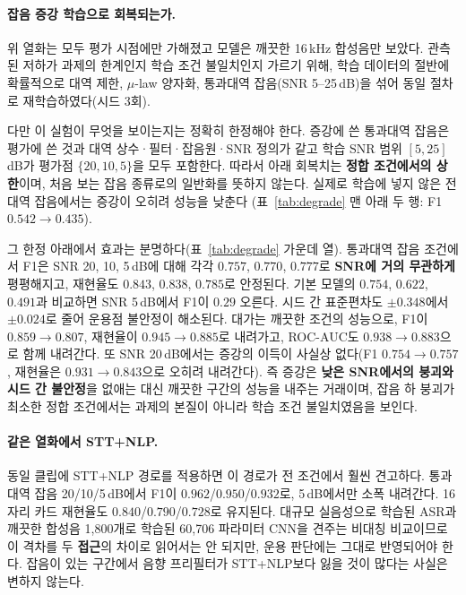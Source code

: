 \documentclass[11pt]{article}
\renewcommand{\emph}[1]{\textbf{#1}}
\begin{document}
\paragraph{잡음 증강 학습으로 회복되는가.}
위 열화는 모두 평가 시점에만 가해졌고 모델은 깨끗한 16\,kHz 합성음만 보았다. 관측된 저하가
과제의 한계인지 학습 조건 불일치인지 가르기 위해, 학습 데이터의 절반에 확률적으로 대역 제한,
$\mu$-law 양자화, 통과대역 잡음(SNR 5--25\,dB)을 섞어 동일 절차로 재학습하였다(시드 3회).

다만 이 실험이 무엇을 보이는지는 정확히 한정해야 한다. 증강에 쓴 통과대역 잡음은 평가에 쓴
것과 대역 상수·필터·잡음원·SNR 정의가 같고 학습 SNR 범위 $[5, 25]$\,dB가 평가점 $\{20, 10, 5\}$을
모두 포함한다. 따라서 아래 회복치는 \emph{정합 조건에서의 상한}이며, 처음 보는 잡음 종류로의
일반화를 뜻하지 않는다. 실제로 학습에 넣지 않은 전대역 잡음에서는 증강이 오히려 성능을 낮춘다
(표~\ref{tab:degrade} 맨 아래 두 행: F1 $0.542\to0.435$).

그 한정 아래에서 효과는 분명하다(표~\ref{tab:degrade} 가운데 열). 통과대역 잡음 조건에서
F1은 SNR 20, 10, 5\,dB에 대해 각각 $0.757$, $0.770$, $0.777$로 \emph{SNR에 거의 무관하게}
평평해지고, 재현율도 $0.843$, $0.838$, $0.785$로 안정된다. 기본 모델의 $0.754$, $0.622$,
$0.491$과 비교하면 SNR 5\,dB에서 F1이 $0.29$ 오른다. 시드 간 표준편차도 $\pm0.348$에서 $\pm0.024$로 줄어 운용점 불안정이
해소된다. 대가는 깨끗한 조건의 성능으로, F1이 $0.859\to0.807$, 재현율이 $0.945\to0.885$로
내려가고, ROC-AUC도 $0.938\to0.883$으로 함께 내려간다. 또 SNR 20\,dB에서는 증강의 이득이
사실상 없다(F1 $0.754\to0.757$, 재현율은 $0.931\to0.843$으로 오히려 내려간다). 즉 증강은
\emph{낮은 SNR에서의 붕괴와 시드 간 불안정}을 없애는 대신 깨끗한 구간의 성능을 내주는 거래이며, 잡음 하 붕괴가 최소한 정합 조건에서는 과제의
본질이 아니라 학습 조건 불일치였음을 보인다.

\paragraph{같은 열화에서 STT+NLP.}
동일 클립에 STT+NLP 경로를 적용하면 이 경로가 전 조건에서 훨씬 견고하다. 통과대역 잡음
20/10/5\,dB에서 F1이 $0.962$/$0.950$/$0.932$로, 5\,dB에서만 소폭 내려간다. 16자리 카드
재현율도 $0.840$/$0.790$/$0.728$로 유지된다. 대규모 실음성으로 학습된 ASR과 깨끗한 합성음
1{,}800개로 학습된 60{,}706 파라미터 CNN을 견주는 비대칭 비교이므로 이 격차를 두 \emph{접근}의
차이로 읽어서는 안 되지만, 운용 판단에는 그대로 반영되어야 한다. 잡음이 있는 구간에서 음향
프리필터가 STT+NLP보다 잃을 것이 많다는 사실은 변하지 않는다.
\end{document}
